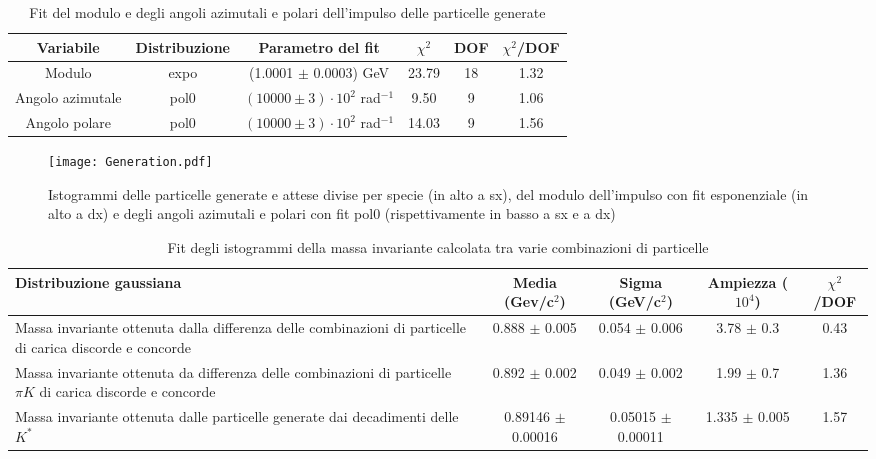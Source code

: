 \documentclass[a4paper,10pt]{article}
\begin{document}
\begin{table}[p]
  \caption{Fit del modulo e degli angoli azimutali e polari dell'impulso delle particelle generate}
  \label{tab:fit}
  \centering
  \begin{tabular}{cccccc}
    \toprule
    Variabile        & Distribuzione & Parametro del fit                     & $\chi^2$ & DOF & $\chi^2$/DOF \\
    \midrule
    Modulo           & expo          & (1.0001 $\pm$ 0.0003) GeV             & 23.79    & 18  & 1.32         \\
    \midrule
    Angolo azimutale & pol0          & $(10000 \pm 3) \cdot 10^2$ rad$^{-1}$ & 9.50     & 9   & 1.06         \\
    Angolo polare    & pol0          & $(10000 \pm 3) \cdot 10^2$ rad$^{-1}$ & 14.03    & 9   & 1.56         \\
    \bottomrule
  \end{tabular}
\end{table}

\begin{figure*}[p]
  \centering
  \texttt{[image: Generation.pdf]}
  \caption{Istogrammi delle particelle generate e attese divise per specie (in alto a sx), del modulo dell'impulso con fit esponenziale (in alto a dx) e degli angoli azimutali e polari con fit pol0 (rispettivamente in basso a sx e a dx)}
  \label{fig:Generation}
\end{figure*}

\begin{table*}
  \caption{Fit degli istogrammi della massa invariante calcolata tra varie combinazioni di particelle}
  \label{tab:fitgaus}
  \centering
  \begin{tabular}{p{4.5cm}cccc}
    \toprule
    Distribuzione gaussiana                                                                                        & Media (Gev/c$^2$)     & Sigma (GeV/c$^2$)     & Ampiezza ($10^4$) & $\chi^2$/DOF \\
    \midrule
    Massa invariante ottenuta dalla differenza delle combinazioni di particelle di carica discorde e concorde      & 0.888 $\pm$ 0.005     & 0.054 $\pm$ 0.006     & 3.78 $\pm$ 0.3    & 0.43         \\
    \midrule
    Massa invariante ottenuta da differenza delle combinazioni di particelle $\pi K$ di carica discorde e concorde & 0.892 $\pm$ 0.002     & 0.049 $\pm$ 0.002     & 1.99 $\pm$ 0.7    & 1.36         \\
    \midrule
    Massa invariante ottenuta dalle particelle generate dai decadimenti delle $K^*$                                & 0.89146 $\pm$ 0.00016 & 0.05015 $\pm$ 0.00011 & 1.335 $\pm$ 0.005 & 1.57         \\
    \bottomrule
  \end{tabular}
\end{table*}
\end{document}

